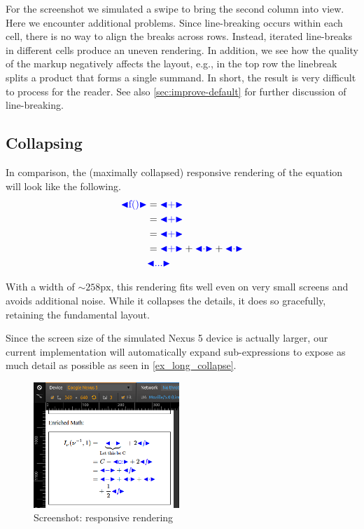 \documentclass{llncs}
\def\collapse#1{\textcolor{blue}{\ensuremath{\mathord{\blacktriangleleft}\mathord{#1}
\mathord{\blacktriangleright}}}}
\begin{document}
For the screenshot we simulated a swipe to bring the second column into
view. Here we encounter additional problems. Since line-breaking occurs within
each cell, there is no way to align the breaks across rows. Instead, iterated
line-breaks in different cells produce an uneven rendering. In addition, we see
how the quality of the markup negatively affects the layout, e.g., in the top
row the linebreak splits a product that forms a single summand. In short, the
result is very difficult to process for the reader. See also
\autoref{sec:improve-default} for further discussion of line-breaking.

\subsection{Collapsing}
\label{sec:collapsing}

  In comparison, the (maximally collapsed) responsive rendering of the equation
  will look like the following.
\begin{align*}
 \collapse{\mathrm{f}()} & = \collapse{+} \\
 & =  \collapse{+} \\ 
 & = \collapse{+} \\ 
 & = \collapse{+} + \collapse{\cdot} + \collapse{\cdot} \\
 & \collapse{...} 
\end{align*}

With a width of 
$\mathbin{\sim} 258\mathrm{px}$, this rendering fits well even on very small 
screens and avoids additional noise. While it collapses the details, it does so 
gracefully, retaining the fundamental layout. 

Since the screen size of the simulated Nexus 5 device is actually larger, our 
current implementation will automatically expand sub-expressions to expose as 
much detail as possible as seen in \autoref{ex_long_collapse}.


\begin{figure}
  \vspace{-20pt}
 \centering 
 \includegraphics[width=0.49\textwidth]{./ex_long_collapse.png}
 \caption{Screenshot: responsive rendering
\label{ex_long_collapse}}
  \vspace{-20pt}
\end{figure}
\end{document}
